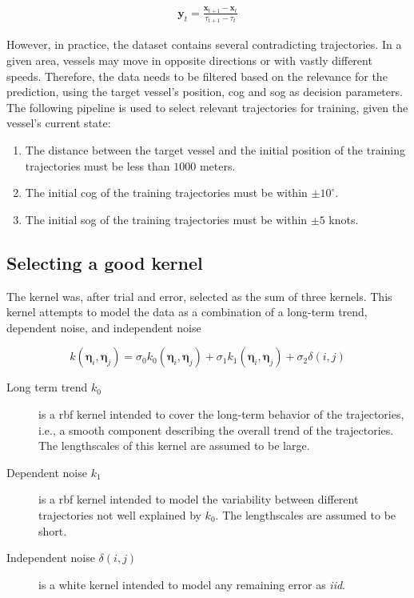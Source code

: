 \begin{align}\label{eq:finite_difference}
    \boldsymbol{y}_t = \frac{\boldsymbol{x}_{t+1} - \boldsymbol{x}_t}{\tau_{t+1} - \tau_t}
\end{align}


However, in practice, the dataset contains several contradicting trajectories. In a given area, vessels may move in opposite directions or with vastly different speeds. Therefore, the data needs to be filtered based on the relevance for the prediction, using the target vessel's position, \acrshort{cog} and \acrshort{sog} as decision parameters. The following pipeline is used to select relevant trajectories for training, given the vessel's current state:
\begin{enumerate}
    \item The distance between the target vessel and the initial position of the training trajectories must be less than $1000$ meters.
    \item The initial \acrshort{cog} of the training trajectories must be within $\pm 10^\circ$.
    \item The initial \acrshort{sog} of the training trajectories must be within $\pm 5$ knots.
\end{enumerate}


\subsection{Selecting a good kernel}
The kernel was, after trial and error, selected as the sum of three kernels. This kernel attempts to model the data as a combination of a long-term trend, dependent noise, and independent noise

\begin{equation}\label{eq:gp_ekf_kernel}
    k(\boldsymbol{\eta}_i, \boldsymbol{\eta}_j) = \sigma_0 k_0(\boldsymbol{\eta}_i, \boldsymbol{\eta}_j) + \sigma_1 k_1(\boldsymbol{\eta}_i, \boldsymbol{\eta}_j) +  \sigma_2 \delta(i, j)
\end{equation}

\begin{description}
    \item[Long term trend $k_0$] is a \acrshort{rbf} kernel intended to cover the long-term behavior of the trajectories, i.e., a smooth component describing the overall trend of the trajectories. The lengthscales of this kernel are assumed to be large.
    \item[Dependent noise $k_1$] is a \acrshort{rbf} kernel intended to model the variability between different trajectories not well explained by $k_0$. The lengthscales are assumed to be short.
    \item[Independent noise $\delta(i, j)$] is a white kernel intended to model any remaining error as \textit{\acrfull{iid}}.
\end{description}

